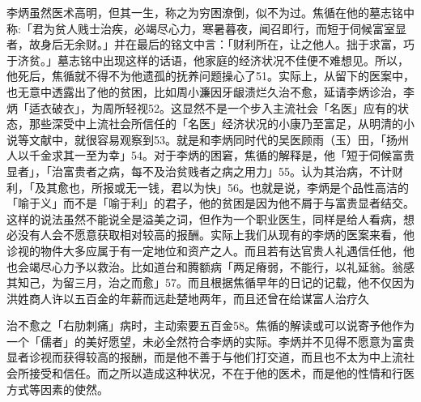 
李炳虽然医术高明，但其一生，称之为穷困潦倒，似不为过。焦循在他的墓志铭中称:「君为贫人贱士治疾，必竭尽心力，寒暑暮夜，闻召即行，而短于伺候富室显者，故身后无余财。」并在最后的铭文中言：「财利所在，让之他人。拙于求富，巧于济贫。」墓志铭中出现这样的话语，他家庭的经济状况不佳便不难想见。所以，他死后，焦循就不得不为他遗孤的抚养问题操心了51。实际上，从留下的医案中，也无意中透露出了他的贫困，比如周小濂因牙龈溃烂久治不愈，延请李炳诊治，李炳「适衣破衣」，为周所轻视52。这显然不是一个步入主流社会「名医」应有的状态，那些深受中上流社会所信任的「名医」经济状况的小康乃至富足，从明清的小说等文献中，就很容易观察到53。就是和李炳同时代的吴医顾雨（玉）田，「扬州人以千金求其一至为幸」54。对于李炳的困窘，焦循的解释是，他「短于伺候富贵显者」，「治富贵者之病，每不及治贫贱者之病之用力」55。认为其治病，不计财利，「及其愈也，所报或无一钱，君以为快」56。也就是说，李炳是个品性高洁的「喻于义」而不是「喻于利」的君子，他的贫困是因为他不屑于与富贵显者结交。这样的说法虽然不能说全是溢美之词，但作为一个职业医生，同样是给人看病，想必没有人会不愿意获取相对较高的报酬。实际上我们从现有的李炳的医案来看，他诊视的物件大多应属于有一定地位和资产之人。而且若有达官贵人礼遇信任他，他也会竭尽心力予以救治。比如道台和腾额病「两足瘠弱，不能行，以礼延翁。翁感其知己，为留三月，治之而愈」57。而且根据焦循早年的日记的记载，他不仅因为洪姓商人许以五百金的年薪而远赴楚地两年，而且还曾在给谋富人治疗久

\vfill
\begin{BookNotes}
\end{BookNotes}

\noindent 治不愈之「右肋刺痛」病时，主动索要五百金58。焦循的解读或可以说寄予他作为一个「儒者」的美好愿望，未必全然符合李炳的实际。李炳并不见得不愿意为富贵显者诊视而获得较高的报酬，而是他不善于与他们打交道，而且也不太为中上流社会所接受和信任。而之所以造成这种状况，不在于他的医术，而是他的性情和行医方式等因素的使然。

